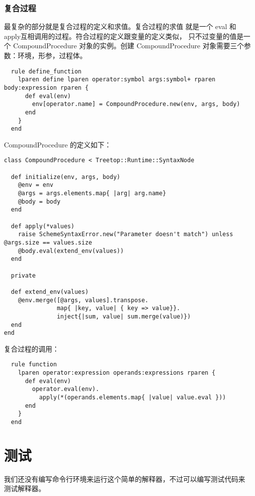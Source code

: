 \documentclass{article}
\begin{document}
\subsubsection{复合过程}
最复杂的部分就是复合过程的定义和求值。复合过程的求值
就是一个 eval 和 apply互相调用的过程。符合过程的定义跟变量的定义类似，
只不过变量的值是一个 CompoundProcedure 对象的实例。创建
CompoundProcedure 对象需要三个参数：环境，形参，过程体。

\begin{verbatim}
  rule define_function
    lparen define lparen operator:symbol args:symbol+ rparen  body:expression rparen {
      def eval(env)
        env[operator.name] = CompoundProcedure.new(env, args, body)
      end
    }
  end

\end{verbatim}
CompoundProcedure 的定义如下：
\begin{verbatim}
class CompoundProcedure < Treetop::Runtime::SyntaxNode

  def initialize(env, args, body)
    @env = env
    @args = args.elements.map{ |arg| arg.name}
    @body = body
  end

  def apply(*values)
    raise SchemeSyntaxError.new("Parameter doesn't match") unless @args.size == values.size
    @body.eval(extend_env(values))
  end

  private

  def extend_env(values)
    @env.merge([@args, values].transpose.
               map{ |key, value| { key => value}}.
               inject{|sum, value| sum.merge(value)})
  end
end

\end{verbatim}

复合过程的调用：
\begin{verbatim}
  rule function
    lparen operator:expression operands:expressions rparen {
      def eval(env)
        operator.eval(env).
          apply(*(operands.elements.map{ |value| value.eval }))
      end
    }
  end
\end{verbatim}
\section{测试}

我们还没有编写命令行环境来运行这个简单的解释器，不过可以编写测试代码来
测试解释器。
\end{document}
